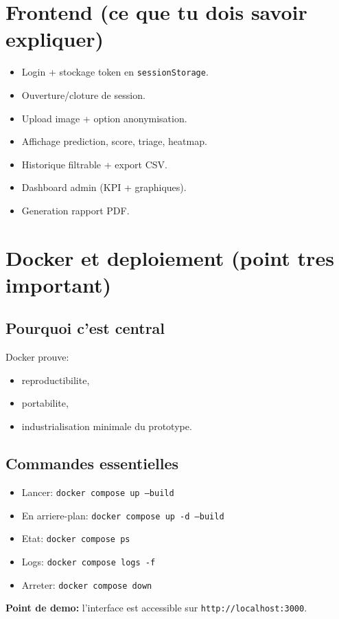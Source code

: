 \documentclass[12pt,a4paper]{article}
\begin{document}
\section{Frontend (ce que tu dois savoir expliquer)}
\begin{itemize}
  \item Login + stockage token en \texttt{sessionStorage}.
  \item Ouverture/cloture de session.
  \item Upload image + option anonymisation.
  \item Affichage prediction, score, triage, heatmap.
  \item Historique filtrable + export CSV.
  \item Dashboard admin (KPI + graphiques).
  \item Generation rapport PDF.
\end{itemize}

\section{Docker et deploiement (point tres important)}
\subsection{Pourquoi c'est central}
Docker prouve:
\begin{itemize}
  \item reproductibilite,
  \item portabilite,
  \item industrialisation minimale du prototype.
\end{itemize}

\subsection{Commandes essentielles}
\begin{itemize}
  \item Lancer: \texttt{docker compose up --build}
  \item En arriere-plan: \texttt{docker compose up -d --build}
  \item Etat: \texttt{docker compose ps}
  \item Logs: \texttt{docker compose logs -f}
  \item Arreter: \texttt{docker compose down}
\end{itemize}

\textbf{Point de demo:} l'interface est accessible sur \texttt{http://localhost:3000}.
\end{document}
